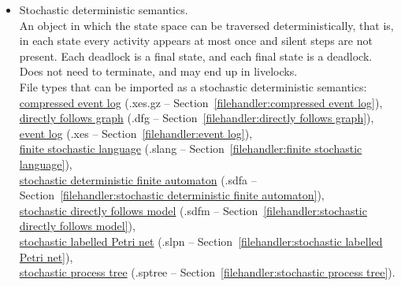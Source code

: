 {\begin{itemize}
\\Commands that accept a semantics as input: \\\null\qquad\hyperref[command:Ebi analyse-non-stochastic executions]{\texttt{Ebi analyse-non-stochastic executions}} (Section~\ref{command:Ebi analyse-non-stochastic executions})\\\null\qquad\hyperref[command:Ebi conformance-non-stochastic alignments]{\texttt{Ebi conformance-non-stochastic alignments}} (Section~\ref{command:Ebi conformance-non-stochastic alignments})\\\null\qquad\hyperref[command:Ebi conformance-non-stochastic escaping-edges-precision]{\texttt{Ebi conformance-non-stochastic escaping-edges-precision}} (Section~\ref{command:Ebi conformance-non-stochastic escaping-edges-precision})\\\null\qquad\hyperref[command:Ebi conformance-non-stochastic set-alignments]{\texttt{Ebi conformance-non-stochastic set-alignments}} (Section~\ref{command:Ebi conformance-non-stochastic set-alignments})
\item Stochastic deterministic semantics.
\\An object in which the state space can be traversed deterministically, that is, in each state every activity appears at most once and silent steps are not present. Each deadlock is a final state, and each final state is a deadlock. Does not need to terminate, and may end up in livelocks.
\\File types that can be imported as a stochastic deterministic semantics: \\\null\qquad\hyperref[filehandler:compressed event log]{compressed event log} (.xes.gz -- Section~\ref{filehandler:compressed event log}), \\\null\qquad\hyperref[filehandler:directly follows graph]{directly follows graph} (.dfg -- Section~\ref{filehandler:directly follows graph}), \\\null\qquad\hyperref[filehandler:event log]{event log} (.xes -- Section~\ref{filehandler:event log}), \\\null\qquad\hyperref[filehandler:finite stochastic language]{finite stochastic language} (.slang -- Section~\ref{filehandler:finite stochastic language}), \\\null\qquad\hyperref[filehandler:stochastic deterministic finite automaton]{stochastic deterministic finite automaton} (.sdfa -- Section~\ref{filehandler:stochastic deterministic finite automaton}), \\\null\qquad\hyperref[filehandler:stochastic directly follows model]{stochastic directly follows model} (.sdfm -- Section~\ref{filehandler:stochastic directly follows model}), \\\null\qquad\hyperref[filehandler:stochastic labelled Petri net]{stochastic labelled Petri net} (.slpn -- Section~\ref{filehandler:stochastic labelled Petri net}), \\\null\qquad\hyperref[filehandler:stochastic process tree]{stochastic process tree} (.sptree -- Section~\ref{filehandler:stochastic process tree}).

\end{itemize}}
